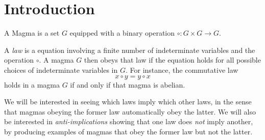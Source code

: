 \chapter{Introduction}

\begin{definition}\label{magma-def}\leanok A Magma is a set $G$ equipped with a binary operation $\circ: G \times G \to G$.
\end{definition}

A \emph{law} is a equation involving a finite number of indeterminate variables and the operation $\circ$.  A magma $G$ then obeys that law if the equation holds for all possible choices of indeterminate variables in $G$.  For instance, the commutative law
$$ x \circ y = y \circ x$$
holds in a magma $G$ if and only if that magma is abelian.

We will be interested in seeing which laws imply which other laws, in the sense that magmas obeying the former law automatically obey the latter.  We will also be interested in \emph{anti-implications} showing that one law does \emph{not} imply another, by producing examples of magmas that obey the former law but not the latter.
